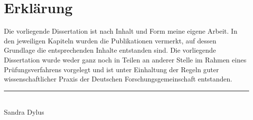 \chapter*{Erkl\"arung}

Die vorliegende Dissertation ist nach Inhalt und Form meine eigene Arbeit.
In den jeweiligen Kapiteln wurden die Publikationen vermerkt, auf dessen Grundlage die entsprechenden Inhalte entstanden sind.
Die vorliegende Dissertation wurde weder ganz noch in Teilen an anderer Stelle im Rahmen eines Pr\"ufungsverfahrens vorgelegt und ist unter Einhaltung der Regeln guter wissenschaftlicher Praxis der Deutschen Forschungsgemeinschaft entstanden.

\vskip 10mm
\hfill\rule{18em}{.3pt}\\%
\vskip 0.1mm
\hfill Sandra Dylus \quad \quad